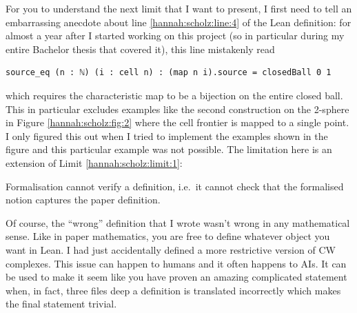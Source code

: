 

For you to understand the next limit that I want to present, I first need to tell an embarrassing anecdote about line \ref{hannah:scholz:line:4} of the Lean definition: for almost a year after I started working on this project (so in particular during my entire Bachelor thesis that covered it), this line mistakenly read 
\begin{lstlisting}[language=lean, numbers=none]
source_eq (n : ℕ) (i : cell n) : (map n i).source = closedBall 0 1
\end{lstlisting}
which requires the characteristic map to be a bijection on the entire closed ball. This in particular excludes examples like the second construction on the 2-sphere in Figure \ref{hannah:scholz:fig:2} where the cell frontier is mapped to a single point. 
I only figured this out when I tried to implement the examples shown in the figure and this particular example was not possible. 
The limitation here is an extension of Limit \ref{hannah:scholz:limit:1}: 

\begin{limit}
    Formalisation cannot verify a definition, i.e.\ it cannot check that the formalised notion captures the paper definition. 
\end{limit}

Of course, the ``wrong'' definition that I wrote wasn't wrong in any mathematical sense. Like in paper mathematics, you are free to define whatever object you want in Lean. I had just accidentally defined a more restrictive version of CW complexes. This issue can happen to humans and it often happens to AIs. It can be used to make it seem like you have proven an amazing complicated statement when, in fact, three files deep a definition is translated incorrectly which makes the final statement trivial. 

